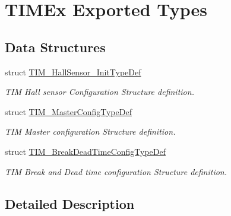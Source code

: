 \hypertarget{group___t_i_m_ex___exported___types}{}\section{T\+I\+M\+Ex Exported Types}
\label{group___t_i_m_ex___exported___types}
\subsection*{Data Structures}
\begin{DoxyCompactItemize}
\item 
struct \hyperlink{struct_t_i_m___hall_sensor___init_type_def}{T\+I\+M\+\_\+\+Hall\+Sensor\+\_\+\+Init\+Type\+Def}
\begin{DoxyCompactList}\small\item\em T\+IM Hall sensor Configuration Structure definition. \end{DoxyCompactList}\item 
struct \hyperlink{struct_t_i_m___master_config_type_def}{T\+I\+M\+\_\+\+Master\+Config\+Type\+Def}
\begin{DoxyCompactList}\small\item\em T\+IM Master configuration Structure definition. \end{DoxyCompactList}\item 
struct \hyperlink{struct_t_i_m___break_dead_time_config_type_def}{T\+I\+M\+\_\+\+Break\+Dead\+Time\+Config\+Type\+Def}
\begin{DoxyCompactList}\small\item\em T\+IM Break and Dead time configuration Structure definition. \end{DoxyCompactList}\end{DoxyCompactItemize}


\subsection{Detailed Description}
